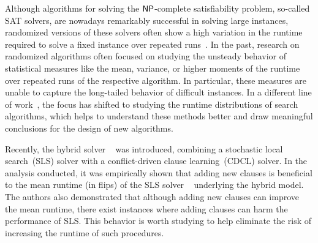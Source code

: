 





Although algorithms for solving the $\textrm{\upshape{\textsf{NP}}}$-complete satisfiability problem, so-called SAT solvers, are nowadays remarkably successful in solving large instances, randomized versions of these solvers often show a high variation in the runtime required to solve a fixed instance over repeated runs~\cite{GSCK00HeavyTailedPhenomena}.
In the past, research on randomized algorithms often focused on studying the unsteady behavior of statistical measures like the mean, variance, or higher moments of the runtime over repeated runs of the respective algorithm. In particular, these measures are unable to capture the long-tailed behavior of difficult instances.
In a different line of work~\cite{FRV97SummarizingCSPHardness,GS97AlgorithmPortfolioDesign,RF97StatisticalAnalysis}, the focus has shifted to studying the runtime distributions of search algorithms, which helps to understand these methods better and draw meaningful conclusions for the design of new algorithms.


Recently, the hybrid solver ~\cite{LW20OnTheEffectOfLearnedClauses} was introduced, combining a stochastic local search~(SLS) solver with a conflict-driven clause learning~(CDCL) solver.
In the analysis conducted,
it was empirically shown that adding new clauses is beneficial to the mean runtime (in flips) of the SLS solver \probSAT{}~\cite{BalintImplementationOfProbSAT} underlying the hybrid model.
The authors also demonstrated that although adding new clauses can improve the mean runtime, there exist instances where adding clauses can harm the performance of SLS.
This behavior is worth studying to help eliminate the risk of increasing the runtime of such procedures.




